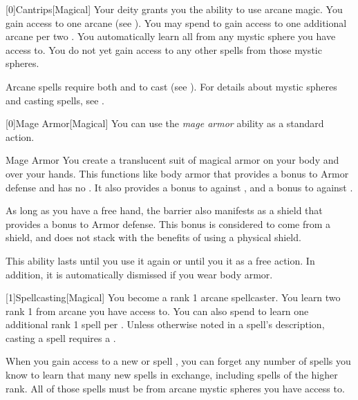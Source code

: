         [0]{Cantrips}[Magical]
        Your deity grants you the ability to use arcane magic.
        You gain access to one arcane  (see ).
        You may spend  to gain access to one additional arcane  per two .
        You automatically learn all  from any mystic sphere you have access to.
        You do not yet gain access to any other spells from those mystic spheres.

        Arcane spells require both  and  to cast (see ).
        For details about mystic spheres and casting spells, see .

        [0]{Mage Armor}[Magical] You can use the \textit{mage armor} ability as a standard action.
        \begin{freeability}{Mage Armor}
            You create a translucent suit of magical armor on your body and over your hands.
            This functions like body armor that provides a  bonus to Armor defense and has no .
            It also provides a  bonus to  against , and a  bonus to  against .

            As long as you have a free hand, the barrier also manifests as a shield that provides a  bonus to Armor defense.
            This bonus is considered to come from a shield, and does not stack with the benefits of using a physical shield.

            This ability lasts until you use it again or until you  it as a free action.
            In addition, it is automatically dismissed if you wear body armor.
        \end{freeability}

        [1]{Spellcasting}[Magical]
        You become a rank 1 arcane spellcaster.
        You learn two rank 1  from arcane  you have access to.
        You can also spend  to learn one additional rank 1 spell per .
        Unless otherwise noted in a spell's description, casting a spell requires a .

        When you gain access to a new  or spell ,
            you can forget any number of spells you know to learn that many new spells in exchange,
            including spells of the higher rank.
        All of those spells must be from arcane mystic spheres you have access to.

